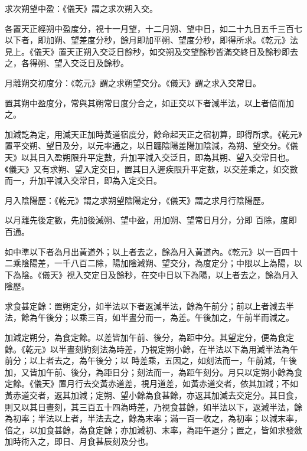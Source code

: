 \begin{pinyinscope}
 求次朔望中盈：《儀天》謂之求次朔入交。



 各置天正經朔中盈度分，視十一月望，十二月朔、望中日，如二十九日五千三百七以下者，即加朔、望差度分秒，餘月即加平朔、望度分秒，即得所求。《乾元》法見上。《儀天》置天正朔入交泛日餘秒，如交朔及交望餘秒皆滿交終日及餘秒即去之，各得朔、望入交泛日及餘秒。



 月離朔交初度分：《乾元》謂之求朔望交分。《儀天》謂之求入交常日。



 置其朔中盈度分，常與其朔常日度分合之，如正交以下者減半法，以上者倍而加之。



 加減訖為定，用減天正加時黃道宿度分，餘命起天正之宿初算，即得所求。《乾元》置平交朔、望日及分，以元率通之，以日躔陰陽差陽加陰減，為朔、望交分。《儀天》以其日入盈朔限升平定數，升加平減入交泛日，即為其朔、望入交常日也。《儀天》又有求朔、望入定交日，置其日入遲疾限升平定數，以交差乘之，如交數而一，升加平減入交常日，即為入定交日。



 月入陰陽歷：《乾元》謂之求朔望陰陽定分，《儀天》謂之求月行陰陽歷。



 以月離先後定數，先加後減朔、望中盈，用加朔、望常日月分，分即
 百除，度即百通。



 如中準以下者為月出黃道外；以上者去之，餘為月入黃道內。《乾元》以一百四十二乘陰陽差，一千八百二除，陽加陰減朔、望交分，為度定分；中限以上為陽，以下為陰。《儀天》視入交定日及餘秒，在交中日以下為陽，以上者去之，餘為月入陰歷。



 求食甚定餘：置朔定分，如半法以下者返減半法，餘為午前分；前以上者減去半法，餘為午後分；以乘三百，如半晝分而一，為差。午後加之，午前半而減之。



 加減定朔分，為食定餘。以差皆加午前、後分，為距中分。其望定分，便為食定餘。《乾元》以半晝刻約刻法為時差，乃視定朔小餘，在半法以下為用減半法為午前分；以上者去之，為午後分；以
 時差乘，五因之，如刻法而一，午前減，午後加，又皆加午前、後分，為距日分；刻法而一，為距午刻分。月只以定朔小餘為食定餘。《儀天》置月行去交黃赤道差，視月道差，如黃赤道交者，依其加減；不如黃赤道交者，返其加減；定朔、望小餘為食甚餘，亦返其加減去交定分。其日食，則又以其日晝刻，其三百五十四為時差，乃視食甚餘，如半法以下，返減半法，餘為初率；半法以上者，半法去之，餘為末率；滿一百一收之，為初率；以減末率，倍之，以加食甚餘，為食定餘；亦加減初、末率，為距午退分；置之，皆如求發斂加時術入之，即日、月食甚辰刻及分也。




\end{pinyinscope}
